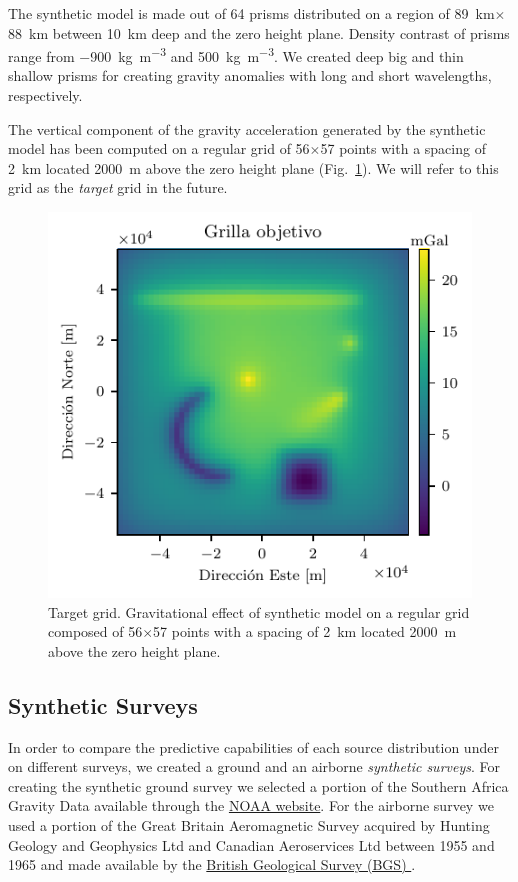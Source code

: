 \documentclass[twocolumn]{article}
\begin{document}
The synthetic model is made out of 64 prisms distributed on a region of
\SI{89}{\km}$\times$\SI{88}{\km} between \SI{10}{\km} deep and the zero
height plane.
Density contrast of prisms range from \SI{-900}{\kg\per\cubic\m} and
\SI{500}{\kg\per\cubic\m}.
We created deep big and thin shallow prisms for creating gravity anomalies with
long and short wavelengths, respectively.

The vertical component of the gravity acceleration generated by the synthetic
model has been computed on a regular grid of 56$\times$57 points with a spacing
of \SI{2}{\km} located \SI{2000}{\m} above the zero height plane
(Fig.~\ref{fig:target-grid}).
We will refer to this grid as the \emph{target} grid in the future.

\begin{figure}
    \includegraphics[width=\linewidth]{figs/target-grid.pdf}
    \caption{
        Target grid. Gravitational effect of synthetic model on a regular grid
        composed of 56$\times$57 points with a spacing of \SI{2}{\km} located
        \SI{2000}{\m} above the zero height plane.
    }
    \label{fig:target-grid}
\end{figure}

\subsection{Synthetic Surveys}

In order to compare the predictive capabilities of each source distribution
under on different surveys, we created a ground and an airborne \emph{synthetic
surveys}.
For creating the synthetic ground survey we selected a portion of the Southern
Africa Gravity Data available through the
\href{https://www.ngdc.noaa.gov/mgg/gravity/gravity.html}{NOAA website}.
For the airborne survey we used a portion of the Great Britain Aeromagnetic
Survey acquired by Hunting Geology and Geophysics Ltd and Canadian Aeroservices
Ltd between 1955 and 1965 and made available by the
\href{https://www.bgs.ac.uk/products/geophysics/aeromagneticRegional.html}{
British Geological Survey (BGS)
}.
\end{document}
